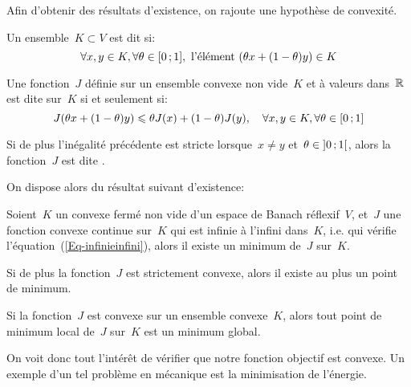 \medskip
Afin d'obtenir des résultats d'existence, on rajoute une hypothèse de convexité.
\begin{definition}[Convexité]
Un ensemble~$K\subset V$ est dit  si:
\begin{equation}
\forall x,y\in K, \forall \theta\in \mathopen{[}0\,;1\mathclose{]}, \text{ l'élément }
(\theta x+(1-\theta)y) \in K
\end{equation}

Une fonction~$J$ définie sur un ensemble convexe non vide~$K$ et à valeurs dans~$\mathbb R$ est dite  sur~$K$ si et seulement si:
\begin{equation}
J(\theta x+(1-\theta)y) \leqslant \theta J(x)+(1-\theta)J(y), \quad \forall x,y\in K, \forall \theta\in \mathopen{[}0\,;1\mathclose{]}
\end{equation}

Si de plus l'inégalité précédente est stricte lorsque~$x\ne y$ et~$\theta\in \mathopen{]}0\,;1\mathclose{[}$, alors la fonction~$J$ est dite .
\end{definition}
On dispose alors du résultat suivant d'existence:
\begin{theoreme}
Soient~$K$ un convexe fermé non vide d'un espace de Banach réflexif~$V$, et~$J$ une fonction convexe continue sur~$K$ qui est infinie à l'infini dans~$K$, i.e. qui vérifie l'équation~(\ref{Eq-infinieinfini}), alors il existe un minimum de~$J$ sur~$K$.
\end{theoreme}
\begin{remarque}[Remarques]
\par\noindent
{}
\par\noindent
{}
\end{remarque}
\begin{theoreme}
Si de plus la fonction~$J$ est strictement convexe, alors il existe au plus un point de minimum.
\end{theoreme}
\begin{theoreme}
Si la fonction~$J$ est convexe sur un ensemble convexe~$K$, alors tout point de minimum local de~$J$ sur~$K$ est un minimum global.
\end{theoreme}
On voit donc tout l'intérêt de vérifier que notre fonction objectif est convexe. Un exemple d'un tel problème en mécanique est la minimisation de l'énergie.

